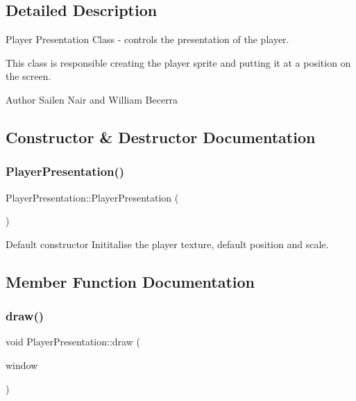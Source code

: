 \subsection{Detailed Description}
Player Presentation Class -\/ controls the presentation of the player. 

This class is responsible creating the player sprite and putting it at a position on the screen. \begin{DoxyAuthor}{Author}
Sailen Nair and William Becerra 
\end{DoxyAuthor}


\subsection{Constructor \& Destructor Documentation}
\mbox{\label{class_player_presentation_ae5b2e1e54cb57697d020eb1afe45225f}} 
\subsubsection{\texorpdfstring{Player\+Presentation()}{PlayerPresentation()}}
{\footnotesize\ttfamily Player\+Presentation\+::\+Player\+Presentation (\begin{DoxyParamCaption}{ }\end{DoxyParamCaption})}

Default constructor Inititalise the player texture, default position and scale. 

\subsection{Member Function Documentation}
\mbox{\label{class_player_presentation_a0ee08eeb4f0c8687450f60d635b4fe8a}} 
\subsubsection{\texorpdfstring{draw()}{draw()}}
{\footnotesize\ttfamily void Player\+Presentation\+::draw (\begin{DoxyParamCaption}\item[{Render\+Window \&}]{window }\end{DoxyParamCaption})}



